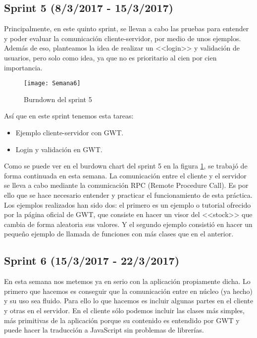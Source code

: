 \subsection{Sprint 5 (8/3/2017 - 15/3/2017)}

Principalmente, en este quinto sprint, se llevan a cabo las pruebas para entender y poder evaluar la comunicación cliente-servidor, por medio de unos ejemplos. Además de eso, planteamos la idea de realizar un <<login>> y validación de usuarios, pero solo como idea, ya que no es prioritario al cien por cien importancia.

\begin{figure}[h]
\centering
\texttt{[image: Semana6]}
\caption{Burndown del sprint 5}
\label{fig:A.4}
\end{figure}


Así que en este sprint tenemos esta tareas:

\begin{itemize}
\item Ejemplo cliente-servidor con GWT.
\item Login y validación en GWT.
\end{itemize}

Como se puede ver en el burdown chart del sprint 5  en la figura \ref{fig:A.4}, se trabajó de forma continuada en esta semana.
La comunicación entre el cliente y el servidor se lleva a cabo mediante la comunicación RPC (Remote Procedure Call). Es por ello que se hace necesario entender y practicar el funcionamiento de esta práctica. Los ejemplos realizados han sido dos: el primero es un ejemplo o tutorial ofrecido por la página oficial de GWT, que consiste en hacer un visor del <<stock>> que cambia de forma aleatoria sus valores. Y el segundo ejemplo consistió en hacer un pequeño ejemplo de llamada de funciones con más clases que en el anterior.


\subsection{Sprint 6 (15/3/2017 - 22/3/2017)}

En esta semana nos metemos ya en serio con la aplicación propiamente dicha. Lo primero que hacemos es conseguir que la comunicación entre en núcleo (ya hecho) y su uso sea fluido. Para ello lo que hacemos es incluir algunas partes en el cliente y otras en el servidor. En el cliente sólo podemos incluir las clases más simples, más primitivas de la aplicación porque su contenido es entendido por GWT y puede hacer la traducción a JavaScript sin problemas de librerías.

